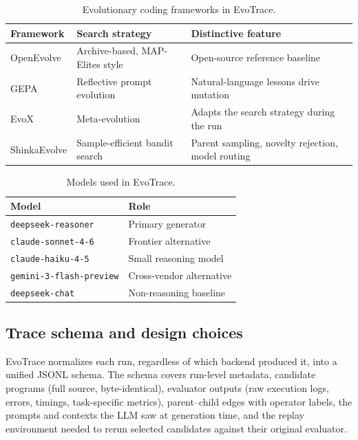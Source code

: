 \begin{table}[t]
\centering
\caption{Evolutionary coding frameworks in EvoTrace.}
\label{tab:frameworks}
\small
\setlength{\tabcolsep}{8pt}
\renewcommand{\arraystretch}{1.2}
\begin{tabular}{@{}lll@{}}
\toprule
\textbf{Framework} & \textbf{Search strategy} & \textbf{Distinctive feature} \\
\midrule
OpenEvolve   & Archive-based, MAP-Elites style & Open-source reference baseline \\
GEPA         & Reflective prompt evolution     & Natural-language lessons drive mutation \\
EvoX         & Meta-evolution                  & Adapts the search strategy during the run \\
ShinkaEvolve & Sample-efficient bandit search  & Parent sampling, novelty rejection, model routing \\
\bottomrule
\end{tabular}
\end{table}

\begin{table}[t]
\centering
\caption{Models used in EvoTrace.}
\label{tab:models}
\small
\setlength{\tabcolsep}{8pt}
\renewcommand{\arraystretch}{1.2}
\begin{tabular}{@{}ll@{}}
\toprule
\textbf{Model} & \textbf{Role} \\
\midrule
\texttt{deepseek-reasoner}      & Primary generator \\
\texttt{claude-sonnet-4-6}      & Frontier alternative \\
\texttt{claude-haiku-4-5}       & Small reasoning model \\
\texttt{gemini-3-flash-preview} & Cross-vendor alternative \\
\texttt{deepseek-chat}          & Non-reasoning baseline \\
\bottomrule
\end{tabular}
\end{table}

\subsection{Trace schema and design choices}
\label{sec:trace_representation}

EvoTrace normalizes each run, regardless of which backend produced it, into a unified JSONL schema. The schema covers run-level metadata, candidate programs (full source, byte-identical), evaluator outputs (raw execution logs, errors, timings, task-specific metrics), parent--child edges with operator labels, the prompts and contexts the LLM saw at generation time, and the replay environment needed to rerun selected candidates against their original evaluator.

